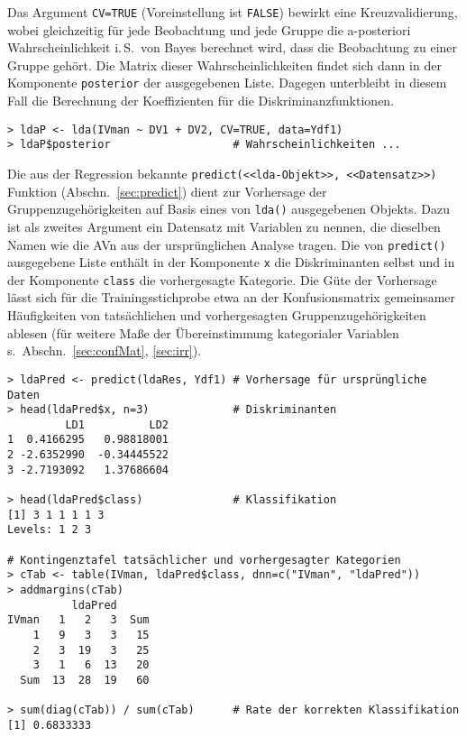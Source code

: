 Das Argument \lstinline!CV=TRUE! (Voreinstellung ist \lstinline!FALSE!) bewirkt eine Kreuzvalidierung, wobei gleichzeitig für jede Beobachtung und jede Gruppe die a-posteriori Wahrscheinlichkeit i.\,S.\ von Bayes berechnet wird, dass die Beobachtung zu einer Gruppe gehört. Die Matrix dieser Wahrscheinlichkeiten findet sich dann in der Komponente \lstinline!posterior! der ausgegebenen Liste. Dagegen unterbleibt in diesem Fall die Berechnung der Koeffizienten für die Diskriminanzfunktionen.
\begin{lstlisting}
> ldaP <- lda(IVman ~ DV1 + DV2, CV=TRUE, data=Ydf1)
> ldaP$posterior                   # Wahrscheinlichkeiten ...
\end{lstlisting}

Die aus der Regression bekannte \lstinline!predict(<<lda-Objekt>>, <<Datensatz>>)! Funktion (Abschn.\ \ref{sec:predict}) dient zur Vorhersage der Gruppenzugehörigkeiten auf Basis eines von \lstinline!lda()! ausgegebenen Objekts. Dazu ist als zweites Argument ein Datensatz mit Variablen zu nennen, die dieselben Namen wie die AVn aus der ursprünglichen Analyse tragen. Die von \lstinline!predict()! ausgegebene Liste enthält in der Komponente \lstinline!x! die Diskriminanten selbst und in der Komponente \lstinline!class! die vorhergesagte Kategorie. Die Güte der Vorhersage lässt sich für die Trainingsstichprobe etwa an der Konfusionsmatrix gemeinsamer Häufigkeiten von tatsächlichen und vorhergesagten Gruppenzugehörigkeiten ablesen (für weitere Maße der Übereinstimmung kategorialer Variablen s.\ Abschn.\ \ref{sec:confMat}, \ref{sec:irr}).
\begin{lstlisting}
> ldaPred <- predict(ldaRes, Ydf1) # Vorhersage für ursprüngliche Daten
> head(ldaPred$x, n=3)             # Diskriminanten
         LD1          LD2
1  0.4166295   0.98818001
2 -2.6352990  -0.34445522
3 -2.7193092   1.37686604

> head(ldaPred$class)              # Klassifikation
[1] 3 1 1 1 1 3
Levels: 1 2 3

# Kontingenztafel tatsächlicher und vorhergesagter Kategorien
> cTab <- table(IVman, ldaPred$class, dnn=c("IVman", "ldaPred"))
> addmargins(cTab)
          ldaPred
IVman   1   2   3  Sum
    1   9   3   3   15
    2   3  19   3   25
    3   1   6  13   20
  Sum  13  28  19   60

> sum(diag(cTab)) / sum(cTab)      # Rate der korrekten Klassifikation
[1] 0.6833333
\end{lstlisting}

